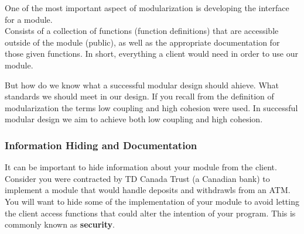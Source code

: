 
One of the most important aspect of modularization is developing the interface for a module.\\

 {
Consists of a collection of functions (function definitions) that are accessible outside of the module (public), as well as the appropriate documentation for those given functions. In short, everything a client would need in order to use our module.
}

But how do we know what a successful modular design should ahieve. What standards we should meet in our design. If you recall from the definition of modularization the terms low coupling and high cohesion were used. In successful modular design we aim to achieve both low coupling and high cohesion.\\





\subsubsection*{Information Hiding and Documentation}

It can be important to hide information about your module from the client. Consider you were contracted by TD Canada Trust (a Canadian bank) to implement a module that would handle deposits and withdrawls from an ATM. You will want to hide some of the implementation of your module to avoid letting the client access functions that could alter the intention of your program. This is commonly known as \textbf{security}.\\

